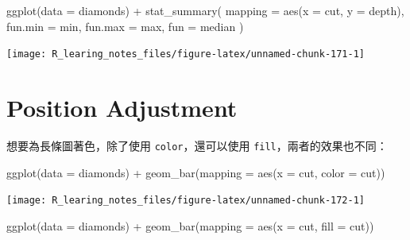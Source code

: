 \documentclass[
]{book}
\newenvironment{Shaded}{\begin{snugshade}}{\end{snugshade}}
\newcommand{\AttributeTok}[1]{\textcolor[rgb]{0.77,0.63,0.00}{#1}}
\newcommand{\FunctionTok}[1]{\textcolor[rgb]{0.00,0.00,0.00}{#1}}
\newcommand{\NormalTok}[1]{#1}
\newcommand{\SpecialCharTok}[1]{\textcolor[rgb]{0.00,0.00,0.00}{#1}}
\theoremstyle{definition}
\theoremstyle{remark}
\begin{document}
\begin{Shaded}
\begin{Highlighting}[]
\FunctionTok{ggplot}\NormalTok{(}\AttributeTok{data =}\NormalTok{ diamonds) }\SpecialCharTok{+}
  \FunctionTok{stat\_summary}\NormalTok{(}
    \AttributeTok{mapping =} \FunctionTok{aes}\NormalTok{(}\AttributeTok{x =}\NormalTok{ cut, }\AttributeTok{y =}\NormalTok{ depth),}
    \AttributeTok{fun.min =}\NormalTok{ min,}
    \AttributeTok{fun.max =}\NormalTok{ max,}
    \AttributeTok{fun =}\NormalTok{ median}
\NormalTok{  )}
\end{Highlighting}
\end{Shaded}

\begin{center}\texttt{[image: R\_learing\_notes\_files/figure-latex/unnamed-chunk-171-1]} \end{center}

\hypertarget{position-adjustment}{%
\section{Position Adjustment}\label{position-adjustment}}

想要為長條圖著色，除了使用 \texttt{color}，還可以使用 \texttt{fill}，兩者的效果也不同：

\begin{Shaded}
\begin{Highlighting}[]
\FunctionTok{ggplot}\NormalTok{(}\AttributeTok{data =}\NormalTok{ diamonds) }\SpecialCharTok{+}
  \FunctionTok{geom\_bar}\NormalTok{(}\AttributeTok{mapping =} \FunctionTok{aes}\NormalTok{(}\AttributeTok{x =}\NormalTok{ cut, }\AttributeTok{color =}\NormalTok{ cut))}
\end{Highlighting}
\end{Shaded}

\begin{center}\texttt{[image: R\_learing\_notes\_files/figure-latex/unnamed-chunk-172-1]} \end{center}

\begin{Shaded}
\begin{Highlighting}[]
\FunctionTok{ggplot}\NormalTok{(}\AttributeTok{data =}\NormalTok{ diamonds) }\SpecialCharTok{+}
  \FunctionTok{geom\_bar}\NormalTok{(}\AttributeTok{mapping =} \FunctionTok{aes}\NormalTok{(}\AttributeTok{x =}\NormalTok{ cut, }\AttributeTok{fill =}\NormalTok{ cut))}
\end{Highlighting}
\end{Shaded}
\end{document}

